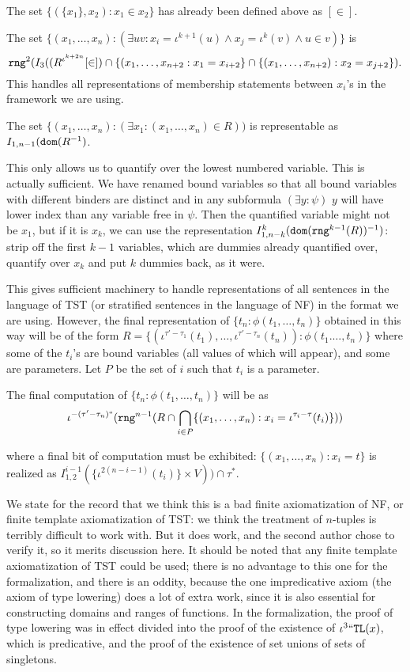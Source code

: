 \documentclass[112pt]{article}
\begin{document}
The set $\{(\{x_1\},x_2):x_1 \in x_2\}$ has already been defined above as $[\in]$.

The set $\{(x_1,\ldots,x_n):(\exists uv:x_i = \iota^{k+1}(u) \wedge x_j = \iota^k(v) \wedge u\in v)\}$ is
$${\tt rng}^2(I_3((R^{\iota^{k+2n}}[\in]) \cap \{(x_1,\ldots,x_{n+2}:x_1 = x_{i+2}\} \cap \{(x_1,\ldots,x_{n+2}):x_2=x_{j+2}\}).$$  This
handles all representations of membership statements between $x_i$'s  in the framework we are using.

The set $\{(x_1,\ldots,x_n):(\exists x_1:(x_1,\ldots,x_n)\in R))$ is representable as $I_{1,n-1}({\tt dom}(R^{-1})$.

This only allows us to quantify over the lowest numbered variable.  This is actually sufficient.  We have renamed bound variables so that all bound variables with different binders are distinct
and in any subformula $(\exists y:\psi)$ $y$ will have lower index than any variable  free in $\psi$.  Then the quantified variable might not be $x_1$, but if it is $x_k$,
we can use the representation $I^{k}_{1,n-k}({\tt dom}({\tt rng}^{k-1}(R))^{-1})$:  strip off the first $k-1$ variables, which are dummies already quantified over,
quantify over $x_k$ and put $k$ dummies back, as it were.

This gives sufficient machinery to handle representations of all sentences in the language of TST (or stratified sentences in the language of NF) in the format we are using.  However, the final representation of  $\{t_n:\phi(t_1,\ldots,t_n)\}$ obtained in this way
will be of the form $R=\{(\iota^{\tau'-\tau_1}(t_1),\ldots,\iota^{\tau'-\tau_n}(t_n)):\phi(t_1.\ldots,t_n)\}$
where some of the $t_i$'s are bound variables (all values of which will appear), and some are parameters.  Let $P$ be the set  of $i$ such that
$t_i$ is a parameter.

The final computation of $\{t_n:\phi(t_1,\ldots,t_n)\}$ will be as 
$$\iota^{-(\tau'-\tau_{n})``}({\tt rng}^{n-1}(R \cap \bigcap_{i \in P}\{(x_1,\ldots,x_n):x_i = \iota^{\tau_i-\tau}(t_i)\}))$$

where a final bit of computation must be exhibited:  $\{(x_1,\ldots,x_n):x_i = t\}$ is realized as
$I^{i-1}_{1,2}(\{\iota^{2(n-i-1)}(t_i)\}\times V))\cap \tau^*.$

We state for the record that we think this is a bad finite axiomatization of NF, or finite template axiomatization of TST:  we think the treatment of $n$-tuples is terribly difficult to work with.  But it does work, and the second author chose to verify it, so it merits discussion here.  It should be noted that any finite template axiomatization of TST could be used;  there is no advantage to this one for the formalization, and there is an oddity, because the one impredicative axiom (the axiom of type lowering) does a lot of extra work, since it is also essential for constructing domains and ranges of functions.  In the formalization, the proof of type lowering was in effect divided into the proof of the existence of $\iota^3``{\tt TL}(x)$, which is predicative, and the proof of the existence of set unions of sets of singletons.
\end{document}
